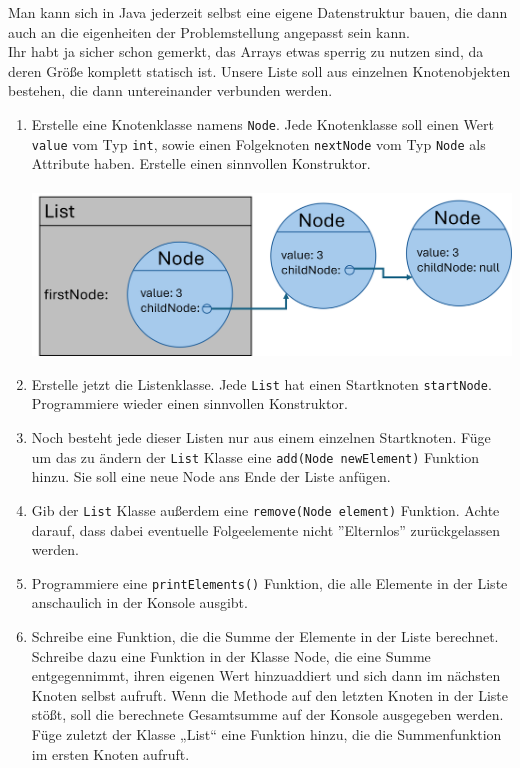 \documentclass{../../sheet}
\begin{document}
\newpage
{}
Man kann sich in Java jederzeit selbst eine eigene Datenstruktur bauen, die dann auch an die eigenheiten der Problemstellung angepasst sein kann. \\
Ihr habt ja sicher schon gemerkt, das Arrays etwas sperrig zu nutzen sind, da deren Größe komplett statisch ist. Unsere Liste soll aus einzelnen Knotenobjekten bestehen, die dann untereinander verbunden werden.
\begin{enumerate}
    \item Erstelle eine Knotenklasse namens \texttt{Node}. Jede Knotenklasse soll einen Wert \texttt{value} vom Typ \texttt{int}, sowie einen Folgeknoten \texttt{nextNode} vom Typ \texttt{Node} als Attribute haben. Erstelle einen sinnvollen Konstruktor.\\\\
          \includegraphics[width=\linewidth]{img/linkedlist.png}
    \item Erstelle jetzt die Listenklasse. Jede \texttt{List} hat einen Startknoten \texttt{startNode}. Programmiere wieder einen sinnvollen Konstruktor.
    \item Noch besteht jede dieser Listen nur aus einem einzelnen Startknoten. Füge um das zu ändern der \texttt{List} Klasse eine \texttt{add(Node newElement)} Funktion hinzu. Sie soll eine neue Node ans Ende der Liste anfügen.
    \item Gib der \texttt{List} Klasse außerdem eine \texttt{remove(Node element)} Funktion. Achte darauf, dass dabei eventuelle Folgeelemente nicht ''Elternlos'' zurückgelassen werden.
    \item Programmiere eine \texttt{printElements()} Funktion, die alle Elemente in der Liste anschaulich in der Konsole ausgibt.
    \item Schreibe eine Funktion, die die Summe der Elemente in der Liste berechnet. Schreibe dazu eine Funktion in der Klasse Node, die eine Summe entgegennimmt, ihren eigenen Wert hinzuaddiert und sich dann im nächsten Knoten selbst aufruft. Wenn die Methode auf den letzten Knoten in der Liste stößt, soll die berechnete Gesamtsumme auf der Konsole ausgegeben werden. Füge zuletzt der Klasse „List“ eine Funktion hinzu, die die Summenfunktion im ersten Knoten aufruft.
\end{enumerate}
\end{document}
